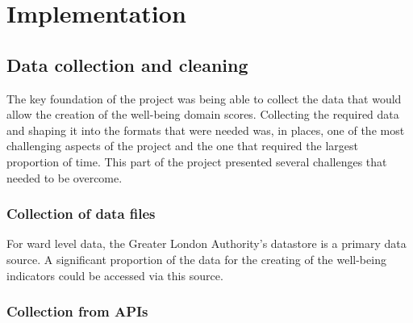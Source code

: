
\chapter{Implementation} %

\label{Chapter5} %


\section{Data collection and cleaning}

The key foundation of the project was being able to collect the data that would allow the creation of the well-being domain scores. Collecting the required data and shaping it into the formats that were needed was, in places, one of the most challenging aspects of the project and the one that required the largest proportion of time. This part of the project presented several challenges that needed to be overcome.

\subsection{Collection of data files}

For ward level data, the Greater London Authority's datastore is a primary data source. A significant proportion of the data for the creating of the well-being indicators could be accessed via this source. 


\subsection{Collection from APIs}

